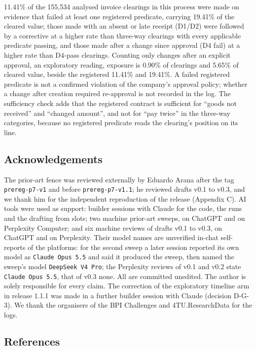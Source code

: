 \documentclass[
  10pt,
]{article}
\begin{document}
11.41\% of the 155,534 analysed invoice clearings in this process were
made on evidence that failed at least one registered predicate, carrying
19.41\% of the cleared value; those made with an absent or late receipt
(D1/D2) were followed by a corrective at a higher rate than three-way
clearings with every applicable predicate passing, and those made after
a change since approval (D4 fail) at a higher rate than D4-pass
clearings. Counting only changes after an explicit approval, an
exploratory reading, exposure is 0.90\% of clearings and 5.65\% of
cleared value, beside the registered 11.41\% and 19.41\%. A failed
registered predicate is not a confirmed violation of the company's
approval policy; whether a change after creation required re-approval is
not recorded in the log. The sufficiency check adds that the registered
contract is sufficient for ``goods not received'' and ``changed
amount'', and not for ``pay twice'' in the three-way categories, because
no registered predicate reads the clearing's position on its line.

\hypertarget{acknowledgements}{%
\subsection{Acknowledgements}\label{acknowledgements}}

The prior-art fence was reviewed externally by Eduardo Arana after the
tag \texttt{prereg-p7-v1} and before \texttt{prereg-p7-v1.1}; he
reviewed drafts v0.1 to v0.3, and we thank him for the independent
reproduction of the release (Appendix C). AI tools were used as support:
builder sessions with Claude for the code, the runs and the drafting
from slots; two machine prior-art sweeps, on ChatGPT and on Perplexity
Computer; and six machine reviews of drafts v0.1 to v0.3, on ChatGPT and
on Perplexity. Their model names are unverified in-chat self-reports of
the platforms: for the second sweep a later session reported its own
model as \texttt{Claude\ Opus\ 5.5} and said it produced the sweep, then
named the sweep's model \texttt{DeepSeek\ V4\ Pro}; the Perplexity
reviews of v0.1 and v0.2 state \texttt{Claude\ Opus\ 5.5}, that of v0.3
none. All are committed unedited. The author is solely responsible for
every claim. The correction of the exploratory timeline arm in release
1.1.1 was made in a further builder session with Claude (decision
D-G-3). We thank the organisers of the BPI Challenges and
4TU.ResearchData for the logs.

\hypertarget{references}{%
\subsection{References}\label{references}}
\end{document}
